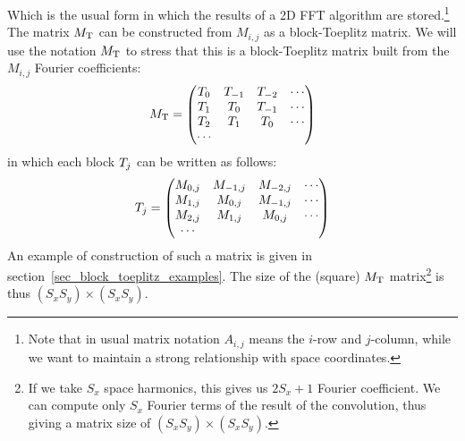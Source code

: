 Which is the usual form in which the results of a 2D FFT algorithm are stored.\footnote{Note that in usual matrix notation $A_{i,j}$ means the $i$-row and $j$-column, while we want to maintain a strong relationship with space coordinates.}
The matrix $M_{\mathrm{T}}$ can be constructed from $M_{i,j}$ as a block-Toeplitz matrix. We will use the notation $M_{\mathrm{T}}$ to stress that this is a block-Toeplitz matrix built from the $M_{i,j}$ Fourier coefficients:
\begin{equation}
M_{\mathrm{T}}=
\begin{pmatrix}
T_{0} & T_{-1} & T_{-2} & \cdots \\
T_{1} & T_{0} & T_{-1} & \cdots \\
T_{2} & T_{1} & T_{0} & \cdots \\
\cdots\\
\label{eq_block_toeplitz1}
\end{pmatrix}
\end{equation}
in which each block $T_j$ can be written as follows:
\begin{equation}
T_j=
\begin{pmatrix}
M_{0,j} & M_{-1,j} & M_{-2,j} & \cdots \\
M_{1,j} & M_{0,j} & M_{-1,j} & \cdots \\
M_{2,j} & M_{1,j} & M_{0,j} & \cdots \\
\cdots\\
\label{eq_block_toeplitz2}
\end{pmatrix}
\end{equation}
An example of construction of such a matrix is given in section~\ref{sec_block_toeplitz_examples}.
The size of the (square) $M_{\mathrm{T}}$ matrix\footnote{If we take $S_x$ space harmonics, this gives us $2S_x+1$ Fourier coefficient. We can compute only $S_x$ Fourier terms of the result of the convolution, thus giving a matrix size of $(S_x S_y)\times (S_x S_y)$.} is thus $(S_x S_y)\times (S_x S_y)$.

